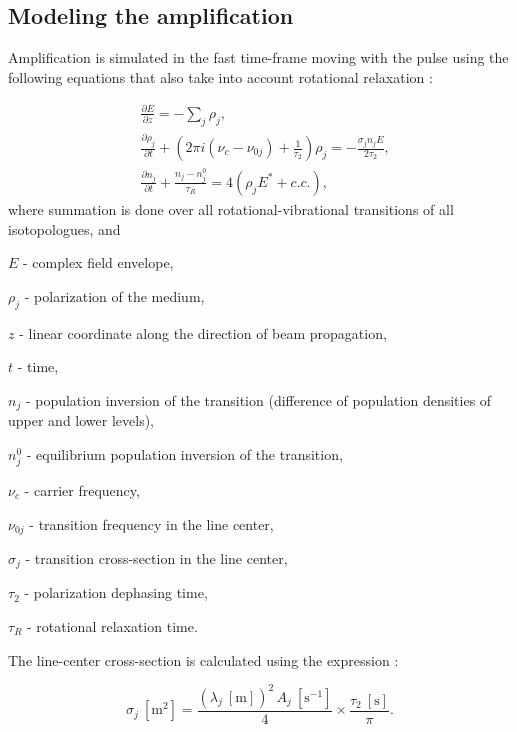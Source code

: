 \documentclass{report}
\begin{document}
\subsection{Modeling the amplification}
Amplification is simulated in the fast time-frame moving with the pulse using the following equations that also take into account rotational relaxation \cite{Feldman-1973,Volkin-1979}:

\begin{equation}\label{eq:amplification}
\begin{aligned}
&\frac{\partial E}{\partial z} =  - \sum\limits_j {\rho _j},\\
&\frac{\partial \rho _j}{\partial t} + \left(2\pi i(\nu _c-\nu _{0j}) + \frac{1}{\tau_2} \right)\rho _j =  - \frac{\sigma _j n_j E}{2\tau_2},\\
&\frac{\partial n_j}{\partial t} + \frac{n_j-n_j^0}{\tau _R} = 4(\rho _j E^* + c.c.),
\end{aligned}
\end{equation}
where summation is done over all rotational-vibrational transitions of all  isotopologues, and

$E$ - complex field envelope,

$\rho_j$ - polarization of the medium,

$z$ - linear coordinate along the direction of beam propagation,

$t$ - time,

$n_j$ - population inversion of the transition (difference of population densities of upper and lower levels),

$n_j^0$ - equilibrium population inversion of the transition,

$\nu _c$ - carrier frequency,

$\nu_{0j}$ - transition frequency in the line center,

$\sigma_j$ - transition cross-section in the line center,

$\tau_2$ - polarization dephasing time,

$\tau_R$ - rotational relaxation time.



The line-center cross-section is calculated using the expression \cite{Hilborn-2002}:

\begin{equation}\label{eq:sigma}
\sigma_j\ [\text{m}^2] = \frac{ (\lambda_j\ [\text{m}])^2\, A_j\ [\text{s}^{-1}] }{4} \times \frac{ \tau_2\ [\text{s}] }{ \pi }.
\end{equation}
\end{document}
